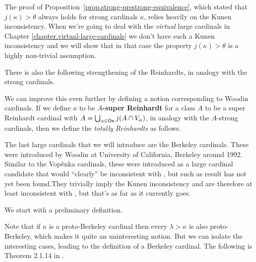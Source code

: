 \documentclass[../../main]{subfiles}
\begin{document}
The proof of Proposition~\ref{prop.strong-prestrong-equivalence}, which stated that $j(\kappa)>\theta$ always holds for strong cardinals $\kappa$, relies heavily on the Kunen inconsistency. When we're going to deal with the \textit{virtual} large cardinals in Chapter \ref{chapter.virtual-large-cardinals} we don't have such a Kunen inconsistency and we will show that in that case the property $j(\kappa)>\theta$ is a highly non-trivial assumption.

\qquad There is also the following strengthening of the Reinhardts, in analogy with the strong cardinals.


We can improve this even further by defining a notion corresponding to Woodin cardinals. If we define $\kappa$ to be \textbf{$A$-super Reinhardt} for a class $A$ to be a super Reinhardt cardinal with $A = \bigcup_{\alpha\in\textsf{On}}j(A\cap V_\alpha)$, in analogy with the $A$-strong cardinals, then we define the \textit{totally Reinhardts} as follows.


The last large cardinals that we will introduce are the Berkeley cardinals. These were introduced by Woodin at University of California, Berkeley around 1992. Similar to the Vop\v enka cardinals, these were introduced as a large cardinal candidate that would ``clearly'' be inconsistent with \zf, but such as result has not yet been found.They trivially imply the Kunen inconsistency and are therefore at least inconsistent with \zfc, but that's as far as it currently goes.

\qquad We start with a preliminary definition.


Note that if $\kappa$ is a proto-Berkeley cardinal then every $\lambda>\kappa$ is also proto-Berkeley, which makes it quite an uninteresting notion. But we can isolate the interesting cases, leading to the definition of a Berkeley cardinal. The following is Theorem 2.1.14 in \cite{Cutolo}.
\end{document}
